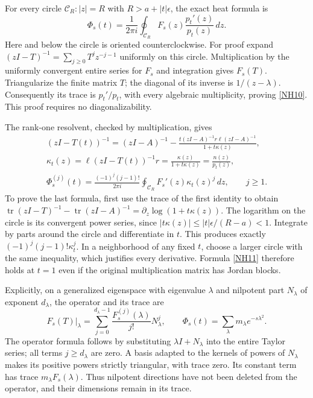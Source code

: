 \documentclass[11pt]{article}
\newcommand{\tr}{\operatorname{tr}}\newcommand{\dd}{\dagger_G}
\newcommand{\eps}{\epsilon}\newcommand{\spec}{\operatorname{spec}}
\begin{document}
For every circle \(\mathcal C_R:|z|=R\) with
\(R>a+|t|\eps\), the exact heat formula is
\begin{equation}\tag{NH10}\label{NH10}
\Phi_s(t)=\frac1{2\pi i}\oint_{\mathcal C_R}
F_s(z)\frac{p_t'(z)}{p_t(z)}\,dz .
\end{equation}
Here and below the circle is oriented counterclockwise.
For proof expand \((zI-T)^{-1}=\sum_{j\ge0}T^jz^{-j-1}\)
uniformly on this circle. Multiplication by the uniformly
convergent entire series for \(F_s\) and integration gives
\(F_s(T)\). Triangularize the finite matrix \(T\);
the diagonal of its inverse is \(1/(z-\lambda)\).
Consequently its trace is \(p_t'/p_t\), with every
algebraic multiplicity, proving \eqref{NH10}.
This proof requires no diagonalizability.

The rank-one resolvent, checked by multiplication, gives
\begin{equation}\tag{NH11}\label{NH11}
\begin{gathered}
(zI-T(t))^{-1}
=(zI-A)^{-1}
-\frac{t(zI-A)^{-1}r\ell(zI-A)^{-1}}{1+t\kappa(z)},\\
\kappa_t(z)=\ell(zI-T(t))^{-1}r
=\frac{\kappa(z)}{1+t\kappa(z)}=\frac{n(z)}{p_t(z)},\\
\Phi_s^{(j)}(t)
=\frac{(-1)^j(j-1)!}{2\pi i}
\oint_{\mathcal C_R}F_s'(z)\kappa_t(z)^j\,dz,\qquad j\ge1.
\end{gathered}
\end{equation}
To prove the last formula, first use the trace of the
first identity to obtain
\(\tr(zI-T)^{-1}-\tr(zI-A)^{-1}
=\partial_z\log(1+t\kappa(z))\).
The logarithm on the circle is its convergent power series,
since \(|t\kappa(z)|\le|t|\eps/(R-a)<1\).
Integrate by parts around the circle and differentiate
in \(t\). This produces exactly
\((-1)^j(j-1)!\kappa_t^j\).
In a neighborhood of any fixed \(t\), choose a larger
circle with the same inequality, which justifies every
derivative. Formula \eqref{NH11} therefore holds at \(t=1\)
even if the original multiplication matrix has Jordan blocks.

Explicitly, on a generalized eigenspace with eigenvalue
\(\lambda\) and nilpotent part \(N_\lambda\) of exponent
\(d_\lambda\), the operator and its trace are
\begin{equation}\tag{NH12}\label{NH12}
F_s(T)|_\lambda
=\sum_{j=0}^{d_\lambda-1}
\frac{F_s^{(j)}(\lambda)}{j!}N_\lambda^j,\qquad
\Phi_s(t)=\sum_\lambda m_\lambda e^{-s\lambda^2}.
\end{equation}
The operator formula follows by substituting
\(\lambda I+N_\lambda\) into the entire Taylor series;
all terms \(j\ge d_\lambda\) are zero.
A basis adapted to the kernels of powers of \(N_\lambda\)
makes its positive powers strictly triangular, with trace
zero. Its constant term has trace \(m_\lambda F_s(\lambda)\).
Thus nilpotent directions have not been deleted from the
operator, and their dimensions remain in its trace.
\end{document}
